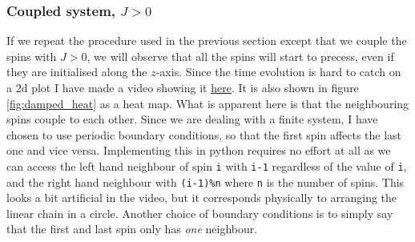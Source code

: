 \subsubsection{Coupled system, $J > 0$}

If we repeat the procedure used in the previous section except that we couple the spins with $J > 0$, we will observe that all the spins will start to precess, even if they are initialised along the $z$-axis. Since the time evolution is hard to catch on a $2\mathrm{d}$ plot I have made a video showing it \href{https://folk.ntnu.no/sondrdl/spinwaves/coupled_spins.mp4}{here}. It is also shown in figure \ref{fig:damped_heat} as a heat map. What is apparent here is that the neighbouring spins couple to each other. Since we are dealing with a finite system, I have chosen to use periodic boundary conditions, so that the first spin affects the last one and vice versa. Implementing this in python requires no effort at all as we can access the left hand neighbour of spin \texttt{i} with \texttt{i-1} regardless of the value of \texttt{i}, and the right hand neighbour with \texttt{(i-1)\%n} where \texttt{n} is the number of spins. This looks a bit artificial in the video, but it corresponds physically to arranging the linear chain in a circle. Another choice of boundary conditions is to simply say that the first and last spin only has \textit{one} neighbour. 


